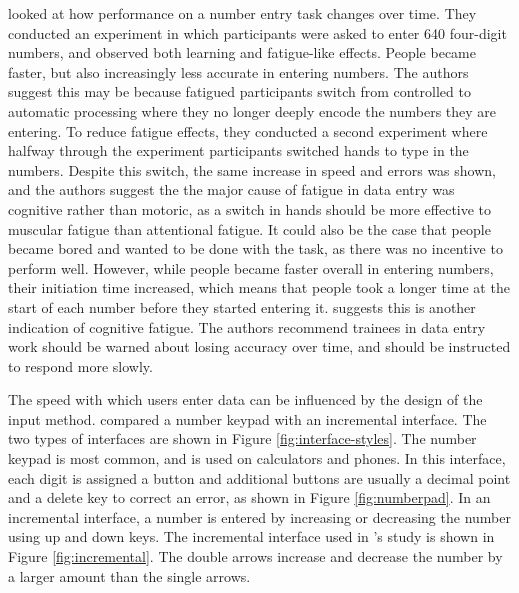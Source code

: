 \citet{Healy2004} looked at how performance on a number entry task changes over time. They conducted an experiment in which participants were asked to enter 640 four-digit numbers, and observed both learning and fatigue-like effects. People became faster, but also increasingly less accurate in entering numbers. The authors suggest this may be because fatigued participants switch from controlled to automatic processing where they no longer deeply encode the numbers they are entering. To reduce fatigue effects, they conducted a second experiment where halfway through the experiment participants switched hands to type in the numbers. Despite this switch, the same increase in speed and errors was shown, and the authors suggest the the major cause of fatigue in data entry was cognitive rather than motoric, as a switch in hands should be more effective to muscular fatigue than attentional fatigue. It could also be the case that people became bored and wanted to be done with the task, as there was no incentive to perform well. However, while people became faster overall in entering numbers, their initiation time increased, which means that people took a longer time at the start of each number before they started entering it. \citet{Healy2004} suggests this is another indication of cognitive fatigue. 
The authors recommend trainees in data entry work should be warned about losing accuracy over time, and should be instructed to respond more slowly. 

The speed with which users enter data can be influenced by the design of the input method. \citet{Oladimeji2011} compared a number keypad with an incremental interface. The two types of interfaces are shown in Figure \ref{fig:interface-styles}. The number keypad is most common, and is used on calculators and phones. In this interface, each digit is assigned a button and additional buttons are usually a decimal point and a delete key to correct an error, as shown in Figure \ref{fig:numberpad}. In an incremental interface, a number is entered by increasing or decreasing the number using up and down keys. The incremental interface used in \citeauthor{Oladimeji2011}'s study is shown in Figure \ref{fig:incremental}. The double arrows increase and decrease the number by a larger amount than the single arrows.

